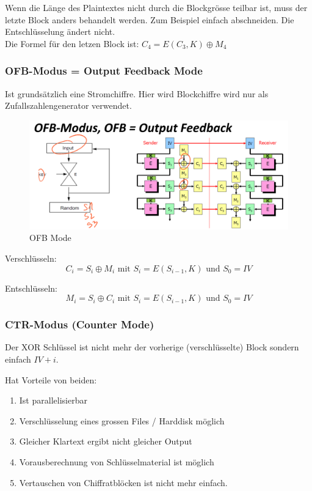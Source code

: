 \documentclass[12pt]{scrartcl}
\begin{document}
Wenn die Länge des Plaintextes nicht durch die Blockgrösse teilbar ist, muss der letzte Block
anders behandelt werden. Zum Beispiel einfach abschneiden. Die Entschlüsselung ändert nicht.\\
Die Formel für den letzen Block ist: $C_4 = E(C_3,K) \oplus M_4$


\subsubsection{OFB-Modus = Output Feedback Mode}

Ist grundsätzlich eine Stromchiffre. Hier wird Blockchiffre wird nur als Zufallszahlengenerator verwendet.

\begin{figure}[ht]
    \centering
    \includegraphics[width=\textwidth]{img/ofb_mode.png}
    \caption{OFB Mode}
    \label{fig:ofb_mode}
\end{figure}

Verschlüsseln:
$$C_i = S_i \oplus M_i \text{ mit } S_i = E(S_{i-1},K) \text{ und } S_0 = IV$$

Entschlüsseln:
$$M_i = S_i \oplus C_i \text{ mit } S_i = E(S_{i-1},K) \text{ und } S_0 = IV$$




\subsubsection{CTR-Modus (Counter Mode)}

Der XOR Schlüssel ist nicht mehr der vorherige (verschlüsselte) Block sondern einfach $IV + i$.

Hat Vorteile von beiden:
\begin{enumerate}
    \item Ist parallelisierbar
    \item Verschlüsselung eines grossen Files / Harddisk möglich
    \item Gleicher Klartext ergibt nicht gleicher Output
    \item Vorausberechnung von Schlüsselmaterial ist möglich
    \item Vertauschen von Chiffratblöcken ist nicht mehr einfach.
\end{enumerate}
\end{document}
